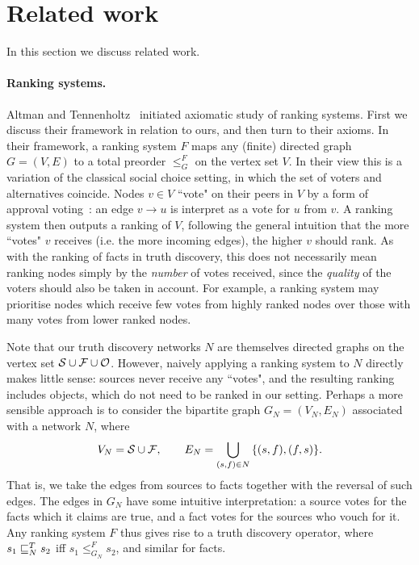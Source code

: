 \section{Related work}
\label{td_sec_relatedwork}

In this section we discuss related work.

\paragraph{Ranking systems.} Altman and Tennenholtz~\cite{altman2008} initiated
axiomatic study of ranking systems. First we discuss their framework in
relation to ours, and then turn to their axioms. In their framework, a ranking
system $F$ maps any (finite) directed graph $G = (V, E)$ to a total preorder
$\le_G^F$ on the vertex set $V$. In their view this is a variation of the
classical social choice setting, in which the set of voters and alternatives
coincide. Nodes $v \in V$ ``vote" on their peers in $V$ by a form of
approval voting~\cite{laslier2010handbook}: an edge $v \to u$ is interpret as a
vote for $u$ from $v$. A ranking system then outputs a ranking of $V$,
following the general intuition that the more ``votes" $v$ receives (i.e. the
more incoming edges), the higher $v$ should rank. As with the ranking of facts
in truth discovery, this does not necessarily mean ranking nodes simply by
the \emph{number} of votes received, since the \emph{quality} of the voters
should also be taken in account. For example, a ranking system may prioritise
nodes which receive few votes from highly ranked nodes over those with many
votes from lower ranked nodes.

Note that our truth discovery networks $N$ are themselves directed graphs on
the vertex set $\mathcal{S} \cup \mathcal{F} \cup \mathcal{O}$. However, naively applying a ranking system
to $N$ directly makes little sense: sources never receive any ``votes", and the
resulting ranking includes objects, which do not need to be ranked in our
setting. Perhaps a more sensible approach is to consider the bipartite graph
$G_N = (V_N, E_N)$ associated with a network $N$, where
\[
    V_N = \mathcal{S} \cup \mathcal{F},
    \qquad
    E_N =
    \bigcup_{(s, f) \in N}{
        \{(s, f), (f, s)\}
    }.
\]
That is, we take the edges from sources to facts together with the reversal of
such edges. The edges in $G_N$ have some intuitive interpretation: a source
votes for the facts which it claims are true, and a fact votes for the sources
who vouch for it. Any ranking system $F$ thus gives rise to a truth discovery
operator, where $s_1 \sqsubseteq_N^T s_2$ iff $s_1 \le_{G_N}^F s_2$, and similar for
facts.

